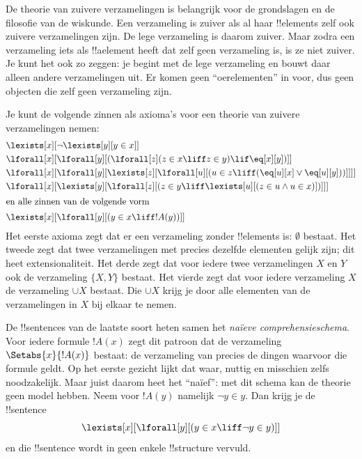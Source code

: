 \documentclass[../../../include/open-logic-section]{subfiles}
\begin{document}
\begin{ex}
De theorie van zuivere verzamelingen is belangrijk voor de grondslagen
en de filosofie van de wiskunde. Een verzameling is zuiver als al haar
!!{element}s zelf ook zuivere verzamelingen zijn. De lege verzameling
is daarom zuiver. Maar zodra een verzameling iets als !!a{element}
heeft dat zelf geen verzameling is, is ze niet zuiver. Je kunt het ook
zo zeggen: je begint met de lege verzameling en bouwt daar alleen
andere verzamelingen uit. Er komen geen ``oerelementen'' in voor, dus
geen objecten die zelf geen verzameling zijn.

Je kunt de volgende zinnen als axioma's voor een theorie van zuivere
verzamelingen nemen:
\begin{align*}
& \lexists[x][\lnot \lexists[y][y \in x]]\\
& \lforall[x][\lforall[y][(\lforall[z](z \in x \liff z \in y) \lif 
\eq[x][y])]]\\
& \lforall[x][\lforall[y][\lexists[z][\lforall[u][(u \in z \liff
(\eq[u][x] \lor \eq[u][y]))]]]]\\
& \lforall[x][\lexists[y][\lforall[z][(z \in y \liff \lexists[u][(z \in
        u \land u \in x)])]]]\\
\intertext{en alle zinnen van de volgende vorm} &
\lexists[x][\lforall[y][(y \in x \liff !A(y))]]
\end{align*}
Het eerste axioma zegt dat er een verzameling zonder !!{element}s is:
$\emptyset$ bestaat. Het tweede zegt dat twee verzamelingen met precies
dezelfde elementen gelijk zijn; dit heet extensionaliteit. Het derde
zegt dat voor iedere twee verzamelingen $X$ en $Y$ ook de verzameling
$\{X, Y\}$ bestaat. Het vierde zegt dat voor iedere verzameling $X$ de
verzameling $\cup X$ bestaat. Die $\cup X$ krijg je door alle elementen
van de verzamelingen in $X$ bij elkaar te nemen.

De !!{sentence}s van de laatste soort heten samen het
\emph{naïeve comprehensieschema}. Voor iedere formule $!A(x)$ zegt dit
patroon dat de verzameling $\Setabs{x}{!A(x)}$ bestaat: de verzameling
van precies de dingen waarvoor die formule geldt. Op het eerste gezicht
lijkt dat waar, nuttig en misschien zelfs noodzakelijk. Maar juist
daarom heet het ``naïef'': met dit schema kan de theorie geen model
hebben. Neem voor $!A(y)$ namelijk $\lnot y \in y$. Dan krijg je de
!!{sentence}
\[
\lexists[x][\lforall[y][(y \in x \liff \lnot y \in y)]]
\]
en die !!{sentence} wordt in geen enkele !!{structure} vervuld.
\end{ex}
\end{document}
